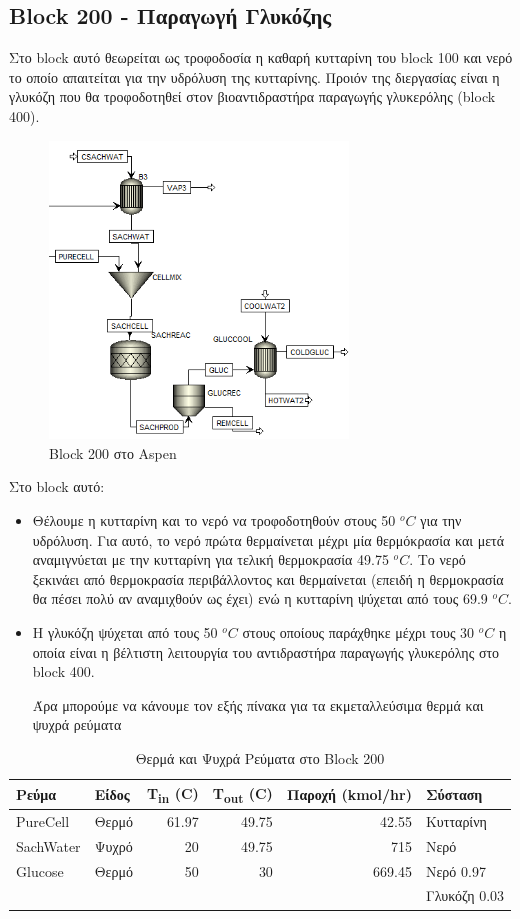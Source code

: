 \documentclass[11pt]{article}
\begin{document}
\subsection{Block 200 - Παραγωγή Γλυκόζης}
\label{sec:orgece4a5a}
Στο block αυτό θεωρείται ως τροφοδοσία η καθαρή κυτταρίνη του block 100 και νερό το οποίο απαιτείται για την υδρόλυση της κυτταρίνης. Προιόν της διεργασίας είναι η γλυκόζη που θα τροφοδοτηθεί στον βιοαντιδραστήρα παραγωγής γλυκερόλης (block 400).

\begin{figure}[htbp]
\centering
\includegraphics[width=300px]{Block_200_-_Παραγωγή_Γλυκόζης/2023-03-11_16-51-41_screenshot.png}
\caption{Block 200 στο Aspen}
\end{figure}


Στο block αυτό:
\begin{itemize}
\item Θέλουμε η κυτταρίνη και το νερό να τροφοδοτηθούν στους 50 \(^oC\) για την υδρόλυση. Για αυτό, το νερό πρώτα θερμαίνεται μέχρι μία θερμόκρασία και μετά αναμιγνύεται με την κυτταρίνη για τελική θερμοκρασία 49.75 \(^oC\). Το νερό ξεκινάει από θερμοκρασία περιβάλλοντος και θερμαίνεται (επειδή η θερμοκρασία θα πέσει πολύ αν αναμιχθούν ως έχει) ενώ η κυτταρίνη ψύχεται από τους 69.9 \(^oC\).
\item Η γλυκόζη ψύχεται από τους 50 \(^oC\) στους οποίους παράχθηκε μέχρι τους 30 \(^oC\) η οποία είναι η βέλτιστη λειτουργία του αντιδραστήρα παραγωγής γλυκερόλης στο block 400.

Άρα μπορούμε να κάνουμε τον εξής πίνακα για τα εκμεταλλεύσιμα θερμά και ψυχρά ρεύματα
\end{itemize}
\begin{table}[htbp]
\caption{Θερμά και Ψυχρά Ρεύματα στο Block 200}
\centering
\begin{tabular}{llrrrl}
Ρεύμα & Είδος & Τ\textsubscript{in} (C) & Τ\textsubscript{out} (C) & Παροχή (kmol/hr) & Σύσταση\\
\hline
PureCell & Θερμό & 61.97 & 49.75 & 42.55 & Κυτταρίνη\\
\hline
SachWater & Ψυχρό & 20 & 49.75 & 715 & Νερό\\
\hline
Glucose & Θερμό & 50 & 30 & 669.45 & Νερό 0.97\\
 &  &  &  &  & Γλυκόζη 0.03\\
\hline
\end{tabular}
\end{table}
\end{document}
